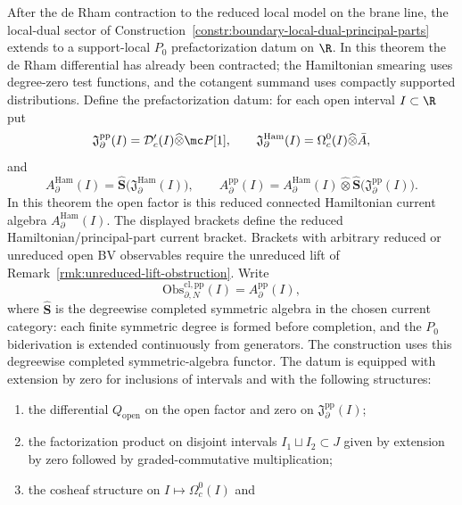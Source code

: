\documentclass[11pt]{memoir}
\begin{document}
\begin{thm}\label{thm:reduced-principal-part-boundary-current}
  After the de Rham contraction to the reduced local model on the brane
  line, the local-dual sector of
  Construction~\ref{constr:boundary-local-dual-principal-parts} extends to
  a support-local \(P_0\) prefactorization datum on \(\R\).  In this
  theorem the de Rham differential has already been contracted; the
  Hamiltonian smearing uses degree-zero test functions, and the cotangent
  summand uses compactly supported distributions.  Define the
  prefactorization datum: for each open interval \(I\subset\R\) put
	  $$\mathfrak J_{\partial}^{\mathrm{pp}}(I)
	    =\mathcal D'_c(I)\widehat\otimes\mc P[1],\qquad
	  \mathfrak J_{\partial}^{\mathrm{Ham}}(I)
	    =\Omega_c^0(I)\widehat\otimes\bar A,$$
  and
  \[
    A_{\partial}^{\mathrm{Ham}}(I)
      =\widehat{\mathbf S}\bigl(\mathfrak J_{\partial}^{\mathrm{Ham}}(I)\bigr),
    \qquad
    A_{\partial}^{\mathrm{pp}}(I)
      =
      A_{\partial}^{\mathrm{Ham}}(I)
      \widehat\otimes
      \widehat{\mathbf S}\bigl(\mathfrak J_{\partial}^{\mathrm{pp}}(I)\bigr).
  \]
  In this theorem the open factor is this reduced connected Hamiltonian
  current algebra \(A_{\partial}^{\mathrm{Ham}}(I)\).  The displayed
  brackets define the reduced Hamiltonian/principal-part current bracket.
  Brackets with arbitrary reduced or unreduced open BV observables require
  the unreduced lift of
  Remark~\ref{rmk:unreduced-lift-obstruction}.  Write
  $$\mathrm{Obs}_{\partial,N}^{\mathrm{cl,pp}}(I)
    = A_{\partial}^{\mathrm{pp}}(I),$$
  where \(\widehat{\mathbf S}\) is the degreewise completed symmetric
  algebra in the chosen current category: each finite symmetric degree
  is formed before completion, and the \(P_0\) biderivation is extended
  continuously from generators. The construction uses this degreewise
  completed symmetric-algebra functor.
  The datum is equipped with extension by zero for inclusions of
  intervals and with the following structures:
  \begin{enumerate}
    \item the differential $Q_{\mathrm{open}}$ on the open factor and zero
      on $\mathfrak J_{\partial}^{\mathrm{pp}}(I)$;
    \item the factorization product on disjoint intervals
      $I_1\sqcup I_2\subset J$ given by extension by zero followed by
      graded-commutative multiplication;
		    \item the cosheaf structure on \(I\mapsto \Omega_c^0(I)\) and

\end{enumerate}
\end{thm}
\end{document}
